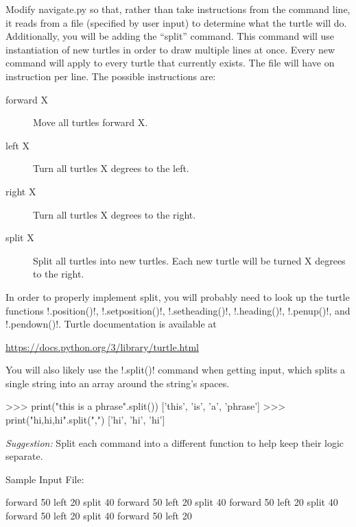 \documentclass[11pt]{cselabheader}
\begin{document}
\begin{ex}[navigate3.py] Modify navigate.py so that, rather than take
  instructions from the command line, it reads from a file (specified by user
  input) to determine what the turtle will do. Additionally, you will be adding
  the ``split'' command. This command will use instantiation of new turtles in
  order to draw multiple lines at once. Every new command will apply to every
  turtle that currently exists. The file will have on instruction per line. The
  possible instructions are:

  \begin{description}
    \item[forward X] Move all turtles forward X.
    \item[left X] Turn all turtles X degrees to the left.
    \item[right X] Turn all turtles X degrees to the right.
    \item[split X] Split all turtles into new turtles. Each new turtle will be 
    turned X degrees to the right.
  \end{description}

  In order to properly implement split, you will probably need to look up the
  turtle functions \pythoninline!.position()!, \pythoninline!.setposition()!,
  \pythoninline!.setheading()!, \pythoninline!.heading()!, \pythoninline!.penup()!, 
   and
  \pythoninline!.pendown()!. Turtle documentation is available at
  \begin{center}
    \url{https://docs.python.org/3/library/turtle.html}
  \end{center}

  You will also likely use the \pythoninline!.split()! command when getting
  input, which splits a single string into an array around the string's
  spaces.
  \begin{pyconcode}
>>> print("this is a phrase".split())
['this', 'is', 'a', 'phrase']
>>> print("hi,hi,hi".split(",")
['hi', 'hi', 'hi']
  \end{pyconcode}

  \emph{Suggestion:} Split each command into a different function to help keep their logic separate.

  Sample Input File:

  \begin{verbatimcode}
forward 50
left 20
split 40
forward 50
left 20
split 40
forward 50
left 20
split 40
forward 50
left 20
split 40
forward 50
left 20
  \end{verbatimcode}


\end{ex}
\end{document}
